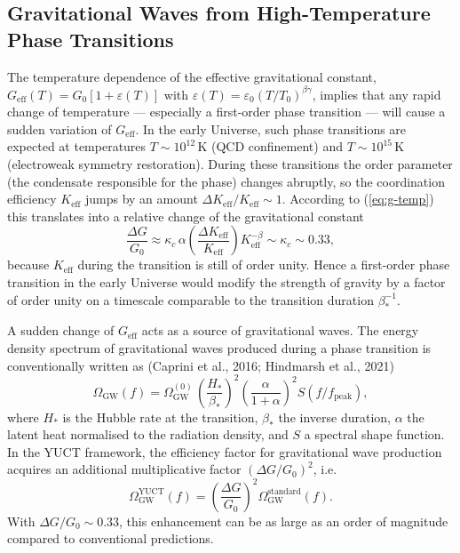 \documentclass[12pt]{article}
\theoremstyle{remark}
\newcommand{\Keff}{K_{\mathrm{eff}}}
\newcommand{\eps}{\varepsilon}
\begin{document}
	\subsection{Gravitational Waves from High-Temperature Phase Transitions}
	\label{subsec:gw}
	
	The temperature dependence of the effective gravitational constant, 
	$G_{\mathrm{eff}}(T)=G_0[1+\eps(T)]$ with $\eps(T)=\eps_0(T/T_0)^{\beta\gamma}$,
	implies that any rapid change of temperature --- especially a first-order phase 
	transition --- will cause a sudden variation of $G_{\mathrm{eff}}$. 
	In the early Universe, such phase transitions are expected at temperatures 
	$T\sim 10^{12}\,\mathrm{K}$ (QCD confinement) and $T\sim 10^{15}\,\mathrm{K}$ 
	(electroweak symmetry restoration). During these transitions the order parameter 
	(the condensate responsible for the phase) changes abruptly, so the coordination 
	efficiency $\Keff$ jumps by an amount $\Delta\Keff/\Keff\sim 1$. 
	According to (\ref{eq:g-temp}) this translates into a relative change of the 
	gravitational constant
	\begin{equation}
		\frac{\Delta G}{G_0} \approx \kappa_c\,\alpha \left(\frac{\Delta\Keff}{\Keff}\right) 
		\Keff^{-\beta} \sim \kappa_c \sim 0.33,
		\label{eq:deltaG-phase}
	\end{equation}
	because $\Keff$ during the transition is still of order unity. 
	Hence a first-order phase transition in the early Universe would modify the 
	strength of gravity by a factor of order unity on a timescale comparable to the 
	transition duration $\beta_*^{-1}$.
	
	A sudden change of $G_{\mathrm{eff}}$ acts as a source of gravitational waves. 
	The energy density spectrum of gravitational waves produced during a phase 
	transition is conventionally written as (Caprini et al., 2016; Hindmarsh et al., 
	2021)
	\begin{equation}
		\Omega_{\mathrm{GW}}(f) = \Omega_{\mathrm{GW}}^{(0)} \,
		\left(\frac{H_*}{\beta_*}\right)^2 \left(\frac{\alpha}{1+\alpha}\right)^2 
		S(f/f_{\mathrm{peak}}),
	\end{equation}
	where $H_*$ is the Hubble rate at the transition, $\beta_*$ the inverse duration,
	$\alpha$ the latent heat normalised to the radiation density, and $S$ a spectral
	shape function. In the YUCT framework, the efficiency factor for gravitational
	wave production acquires an additional multiplicative factor 
	$(\Delta G/G_0)^2$, i.e.
	\begin{equation}
		\Omega_{\mathrm{GW}}^{\mathrm{YUCT}}(f) = \left(\frac{\Delta G}{G_0}\right)^2 
		\Omega_{\mathrm{GW}}^{\mathrm{standard}}(f).
	\end{equation}
	With $\Delta G/G_0\sim 0.33$, this enhancement can be as large as an order of
	magnitude compared to conventional predictions.
	
\end{document}
